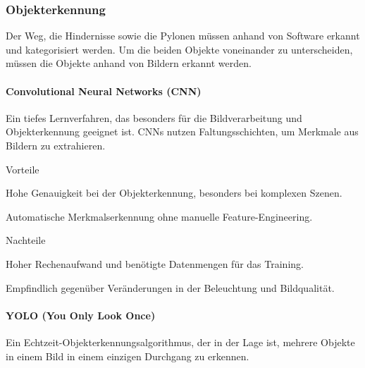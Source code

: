 \subsubsection{Objekterkennung}

Der Weg, die Hindernisse sowie die Pylonen müssen anhand von Software erkannt und kategorisiert werden. Um die beiden Objekte voneinander zu unterscheiden, müssen die Objekte anhand von Bildern erkannt werden.

\paragraph{Convolutional Neural Networks (CNN)}

Ein tiefes Lernverfahren, das besonders für die Bildverarbeitung und Objekterkennung geeignet ist. CNNs nutzen Faltungsschichten, um Merkmale aus Bildern zu extrahieren.

\begin{minipage}[t]{0.48\textwidth}
\begin{items}
  \item [Vorteile]
  \item Hohe Genauigkeit bei der Objekterkennung, besonders bei komplexen Szenen.
  \item Automatische Merkmalserkennung ohne manuelle Feature-Engineering.
\end{items}
\end{minipage}
\hfill
\begin{minipage}[t]{0.48\textwidth}
\begin{items}
  \item [Nachteile]
  \item Hoher Rechenaufwand und benötigte Datenmengen für das Training.
  \item Empfindlich gegenüber Veränderungen in der Beleuchtung und Bildqualität.
\end{items}
\end{minipage}

\paragraph{YOLO (You Only Look Once)}

Ein Echtzeit-Objekterkennungsalgorithmus, der in der Lage ist, mehrere Objekte in einem Bild in einem einzigen Durchgang zu erkennen.

